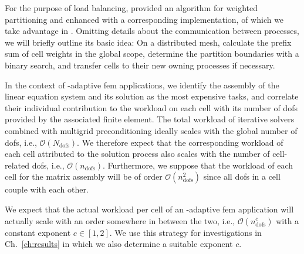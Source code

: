 

For the purpose of load balancing, \textcite[Sec.~3.3]{burstedde2011} provided an algorithm for weighted partitioning and enhanced \pforest{} \textcite{p4est22} with a corresponding implementation, of which we take advantage in \dealii{}. Omitting details about the communication between processes, we will briefly outline its basic idea: On a distributed mesh, calculate the prefix sum of cell weights in the global scope, determine the partition boundaries with a binary search, and transfer cells to their new owning processes if necessary.




In the context of \hp-adaptive \gls{fem} applications, we identify the assembly of the linear equation system and its solution as the most expensive tasks, and correlate their individual contribution to the workload on each cell with its number of \glspl{dof} provided by the associated finite element.
The total workload of iterative solvers combined with multigrid preconditioning ideally scales with the global number of \glspl{dof}, i.e., $\mathcal{O}\left(N_\text{dofs}\right)$. We therefore expect that the corresponding workload of each cell attributed to the solution process also scales with the number of cell-related \glspl{dof}, i.e., $\mathcal{O}\left(n_\text{dofs}\right)$. Furthermore, we suppose that the workload of each cell for the matrix assembly will be of order $\mathcal{O}\left(n_\text{dofs}^2\right)$ since all \glspl{dof} in a cell couple with each other.

We expect that the actual workload per cell of an \hp-adaptive \gls{fem} application will actually scale with an order somewhere in between the two, i.e., $\mathcal{O}\left(n_\text{dofs}^c\right)$ with a constant exponent $c \in [1,2]$. We use this strategy for investigations in Ch.~\ref{ch:results} in which we also determine a suitable exponent $c$.

